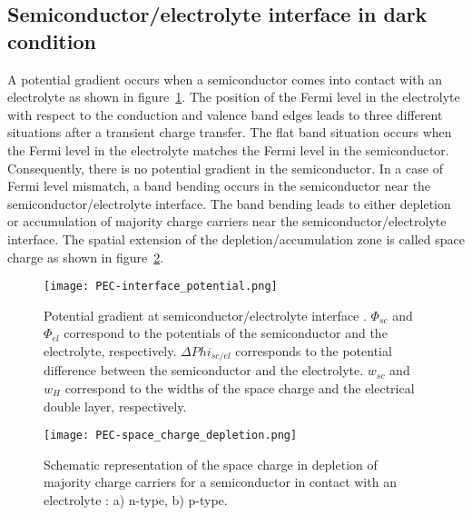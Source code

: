 \subsection{Semiconductor/electrolyte interface in dark condition}
    A potential gradient occurs when a semiconductor comes into contact with an 
    electrolyte as shown in figure~\ref{fig_interface_potential}.
    The position of the Fermi level in the electrolyte with respect to the 
    conduction and valence band edges leads to three different situations after 
    a transient charge transfer. 
    The flat band situation occurs when the Fermi level in the electrolyte 
    matches the Fermi level in the semiconductor.  
    Consequently, there is no potential gradient in the semiconductor. 
    In a case of Fermi level mismatch, a band bending occurs in the semiconductor 
    near the semiconductor/electrolyte interface.  
    The band bending leads to either depletion or accumulation of majority 
    charge carriers near the semiconductor/electrolyte interface. 
    The spatial extension of the depletion/accumulation zone is called space 
    charge as shown in figure~\ref{fig_space_charge_depletion}. 

    \begin{figure}[h]
        \centering
        \texttt{[image: PEC-interface\_potential.png]}
        \caption{Potential gradient at semiconductor/electrolyte interface 
        \citep{marcus2006}. $\Phi_{sc}$ and $\Phi_{el}$ correspond to the 
        potentials of the semiconductor and the electrolyte, respectively. 
        $\Delta Phi _{sc/el}$ corresponds to the potential difference between 
        the semiconductor and the electrolyte. $w_{sc}$ and $w_{H}$ correspond to 
        the widths of the space charge and the electrical double layer, 
        respectively.}
        \label{fig_interface_potential}
    \end{figure}

    \begin{figure}[H]
        \centering
        \texttt{[image: PEC-space\_charge\_depletion.png]}
        \caption{Schematic representation of the space charge in depletion of majority charge carriers for 
        a semiconductor in contact with an electrolyte \citep{memming2008,bard2002}:
         a) n-type, b) p-type.}
        \label{fig_space_charge_depletion}
    \end{figure}

